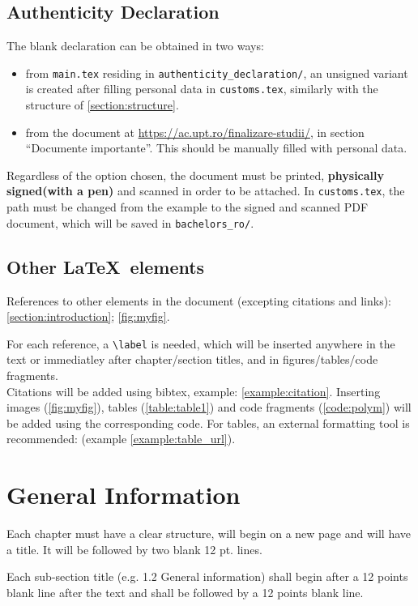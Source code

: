 \subsection{Authenticity Declaration}
The blank declaration can be obtained in two ways:
\begin{itemize}
	\item from \texttt{main.tex} residing in \texttt{authenticity\_declaration/}, an unsigned variant is created after filling personal data in \texttt{customs.tex}, similarly with the structure of \cref{section:structure}.
	\item from the document at \url{https://ac.upt.ro/finalizare-studii/}, in section \enquote{Documente importante}. This should be manually filled with personal data.
\end{itemize}
Regardless of the option chosen, the document must be printed, \textbf{physically signed(with a pen)} and scanned in order to be attached. In \texttt{customs.tex}, the path must be changed from the example to the signed and scanned PDF document, which will be saved in \texttt{bachelors\_ro/}.

\subsection{Other \LaTeX\ elements}
References to other elements in the document (excepting citations and links): \cref{section:introduction}; \cref{fig:myfig}.

For each reference, a \texttt{\textbackslash label} is needed, which will be inserted anywhere in the text or immediatley after chapter/section titles, and in figures/tables/code fragments.
\\[\baselineskip]

Citations will be added using bibtex, example: \cref{example:citation}.
Inserting images (\cref{fig:myfig}), tables (\cref{table:table1}) and code fragments (\cref{code:polym}) will be added using the corresponding code. For tables, an external formatting tool is recommended: (example \cref{example:table_url}).

\section{General Information}

Each chapter must have a clear structure, will begin on a new page and will have a title. It will be followed by two blank 12 pt. lines.

Each sub-section title (e.g. 1.2 General information) shall begin after a 12 points blank line after the text and shall be followed by a 12 points blank line.

